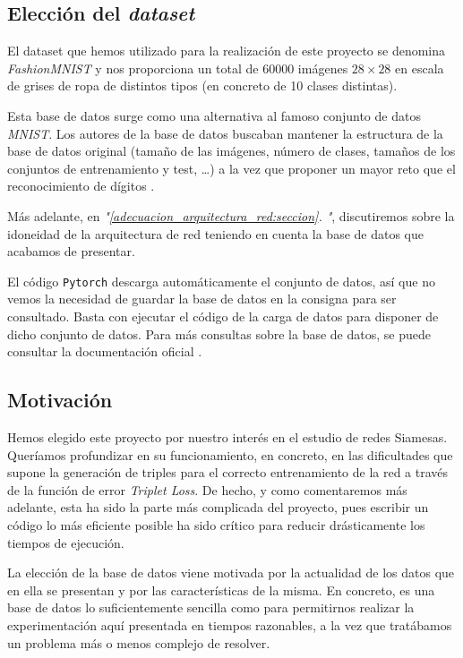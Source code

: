 \documentclass[11pt]{article}
\newcommand{\customcite}[1]{\emph{"\ref{#1}. \nameref{#1}"}}
\begin{document}
\subsection{Elección del \emph{dataset}}

El dataset que hemos utilizado para la realización de este proyecto se denomina \emph{FashionMNIST} \cite{zalando_dataset:online} y nos proporciona un total de 60000 imágenes $28 \times 28$ en escala de grises de ropa de distintos tipos (en concreto de 10 clases distintas).

Esta base de datos surge como una alternativa al famoso conjunto de datos \emph{MNIST}. Los autores de la base de datos buscaban mantener la estructura de la base de datos original (tamaño de las imágenes, número de clases, tamaños de los conjuntos de entrenamiento y test, \ldots) a la vez que proponer un mayor reto que el reconocimiento de dígitos \cite{database_why:online}.

Más adelante, en \customcite{adecuacion_arquitectura_red:seccion}, discutiremos sobre la idoneidad de la arquitectura de red teniendo en cuenta la base de datos que acabamos de presentar.

El código \lstinline{Pytorch} descarga automáticamente el conjunto de datos, así que no vemos la necesidad de guardar la base de datos en la consigna para ser consultado. Basta con ejecutar el código de la carga de datos para disponer de dicho conjunto de datos. Para más consultas sobre la base de datos, se puede consultar la documentación oficial \cite{zalando_dataset:online}.

\subsection{Motivación} \label{motivacion:seccion}

Hemos elegido este proyecto por nuestro interés en el estudio de redes Siamesas. Queríamos profundizar en su funcionamiento, en concreto, en las dificultades que supone la generación de triples para el correcto entrenamiento de la red a través de la función de error \emph{Triplet Loss}. De hecho, y como comentaremos más adelante, esta ha sido la parte más complicada del proyecto, pues escribir un código lo más eficiente posible ha sido crítico para reducir drásticamente los tiempos de ejecución.

La elección de la base de datos viene motivada por la actualidad de los datos que en ella se presentan y por las características de la misma. En concreto, es una base de datos lo suficientemente sencilla como para permitirnos realizar la experimentación aquí presentada en tiempos razonables, a la vez que tratábamos un problema más o menos complejo de resolver.
\end{document}
